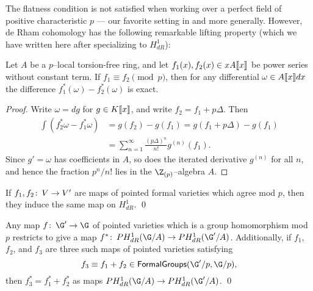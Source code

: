 
The flatness condition is not satisfied when working over a perfect field of positive characteristic $p$ --- our favorite setting in  and  more generally.  However, de Rham cohomology has the following remarkable lifting property (which we have written here after specializing to $H^1_{dR}$):

\begin{theorem}{\cite[Key Lemma 5.1.3]{Katz}}
Let $A$ be a $p$--local torsion-free ring, and let $f_1(x), f_2(x) \in x A\llbracket{x}\rrbracket$ be power series without constant term.  If $f_1 \equiv f_2 \pmod{p}$, then for any differential $\omega \in A\llbracket{x}\rrbracket dx$ the difference $f_1^*(\omega) - f_2^*(\omega)$ is exact.
\end{theorem}
\begin{proof}
Write $\omega = dg$ for $g \in K\llbracket{x}\rrbracket$, and write $f_2 = f_1 + p\Delta$.  Then
\begin{align*}
\int \left( f_2^* \omega - f_1^* \omega \right) & = g(f_2) - g(f_1) = g(f_1 + p\Delta) - g(f_1) \\
& = \sum_{n = 1}^\infty \frac{(p\Delta)^n}{n!} g^{(n)}(f_1).
\end{align*}
Since $g' = \omega$ has coefficients in $A$, so does the iterated derivative $g^{(n)}$ for all $n$, and hence the fraction $p^n/n!$ lies in the $\Z_{(p)}$--algebra $A$.
\end{proof}

\begin{corollary}[{$H^1_{dR}$ is ``crystalline''}]\label{H1dRIsCrystalline}
If $f_1, f_2\colon\thinspace V \to V'$ are maps of pointed formal varieties which agree mod $p$, then they induce the same map on $H^1_{dR}$. \qed
\end{corollary}

\begin{corollary}
Any map $f\co \G' \to \G$ of pointed varieties which is a group homomorphism mod $p$ restricts to give a map $f^*\co PH^1_{dR}(\G/A) \to PH^1_{dR}(\G'/A)$.  Additionally, if $f_1$, $f_2$, and $f_3$ are three such maps of pointed varieties satisfying \[f_3 \equiv f_1 + f_2 \in \CatOf{FormalGroups}(\G'/p, \G/p),\] then $f_3^* = f_1^* + f_2^*$ as maps $PH^1_{dR}(\G/A) \to PH^1_{dR}(\G'/A)$. \qed
\end{corollary}

